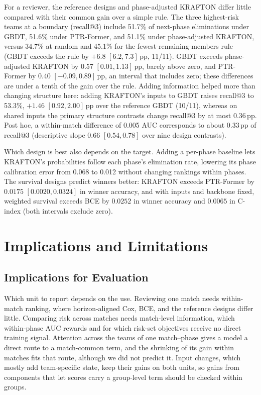 \documentclass[sigconf,anonymous]{acmart}
\begin{document}
For a reviewer, the reference designs and phase-adjusted KRAFTON differ little compared with their common gain over a simple rule. The three highest-risk teams at a boundary (recall@3) include 51.7\% of next-phase eliminations under GBDT, 51.6\% under PTR-Former, and 51.1\% under phase-adjusted KRAFTON, versus 34.7\% at random and 45.1\% for the fewest-remaining-members rule (GBDT exceeds the rule by $+6.8$ $[6.2,\allowbreak 7.3]$\,pp, 11/11). GBDT exceeds phase-adjusted KRAFTON by $0.57$ $[0.01,\allowbreak 1.13]$\,pp, barely above zero, and PTR-Former by $0.40$ $[-0.09,\allowbreak 0.89]$\,pp, an interval that includes zero; these differences are under a tenth of the gain over the rule. Adding information helped more than changing structure here: adding KRAFTON's inputs to GBDT raises recall@3 to 53.3\%, $+1.46$ $[0.92,\allowbreak 2.00]$\,pp over the reference GBDT (10/11), whereas on shared inputs the primary structure contrasts change recall@3 by at most 0.36\,pp. Post hoc, a within-match difference of 0.005 AUC corresponds to about 0.33\,pp of recall@3 (descriptive slope 0.66 $[0.54,\allowbreak 0.78]$ over nine design contrasts).

Which design is best also depends on the target. Adding a per-phase baseline lets KRAFTON's probabilities follow each phase's elimination rate, lowering its phase calibration error from 0.068 to 0.012 without changing rankings within phases. The survival designs predict winners better: KRAFTON exceeds PTR-Former by $0.0175$ $[0.0020,\allowbreak 0.0324]$ in winner accuracy, and with inputs and backbone fixed, weighted survival exceeds BCE by $0.0252$ in winner accuracy and $0.0065$ in C-index (both intervals exclude zero).

\section{Implications and Limitations}
\label{sec:discussion}
\subsection{Implications for Evaluation}
\label{sec:discussion:implications}
Which unit to report depends on the use. Reviewing one match needs within-match ranking, where horizon-aligned Cox, BCE, and the reference designs differ little. Comparing risk across matches needs match-level information, which within-phase AUC rewards and for which risk-set objectives receive no direct training signal. Attention across the teams of one match--phase gives a model a direct route to a match-common term, and the shrinking of its gain within matches fits that route, although we did not predict it. Input changes, which mostly add team-specific state, keep their gains on both units, so gains from components that let scores carry a group-level term should be checked within groups.
\end{document}
